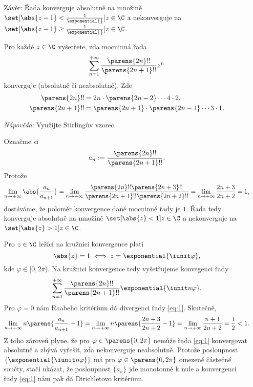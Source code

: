 \documentclass[answers]{exam}
\begin{document}
\begin{questions}
\begin{solution}
		Závěr: Řada konverguje absolutně na množině $\set[\abs{z - 1} < \frac{1}{\exponential{}}]{z \in \C}$ a nekonverguje na $\set[\abs{z - 1} \ge \frac{1}{\exponential{}}]{z \in \C}$.
  \end{solution}

  \question
  Pro každé $z \in \C$ vyšetřete, zda mocninná řada
  \begin{equation*}
    \sum_{n = 1}^{+\infty}
		\frac{\parens{2n}!!}{\parens{2n + 1}!!}z^n
  \end{equation*}
  konverguje (absolutně či neabsolutně). Zde
  \begin{align*}
  	\parens{2n}!! &= 2n \cdot \parens{2n-2} \cdots 4\cdot 2,
  	\\
  	\parens{2n+1}!! &= \parens{2n+1} \cdot \parens{2n-1} \cdots 3 \cdot 1.
  \end{align*}
  
  \emph{Nápověda:} Využijte Stirlingův vzorec.
  
  \begin{solution}
  	Označme si
  	\begin{equation*}
  		a_n
  		:=
  		\frac{\parens{2n}!!}{\parens{2n + 1}!!}.
  	\end{equation*}
  	Protože
  	\begin{equation*}
  		\lim_{n\to+\infty}
  		\abs{\frac{a_n}{a_{n+1}}}
  		=
  		\lim_{n\to+\infty}
  		\frac{\parens{2n}!! \parens{2n+3}!!}{\parens{2n+1}!! \parens{2n+2}!!}
  		=
  		\lim_{n\to+\infty} \frac{2n+3}{2n+2}
  		=
  		1,
  	\end{equation*}
  	dostáváme, že poloměr konvergence dané mocninné řady je $1$. Řada tedy konverguje absolutně na množině $\set[\abs{z} < 1]{z \in \C}$ a nekonverguje na $\set[\abs{z} > 1]{z \in \C}$.
  	
  	Pro $z \in \C$ ležící na kružnici konvergence platí
  	\begin{equation*}
  		\abs{z} = 1
  		\iff
  		z = \exponential{\iunit \varphi},
  	\end{equation*}
  	kde $\varphi \in [0, 2\pi)$. Na kružnici konvergence tedy vyšetřujeme konvegenci řady
  	\begin{equation}
  		\label{eq:1}
	    \sum_{n = 1}^{+\infty}
			\frac{\parens{2n}!!}{\parens{2n + 1}!!} 
				\exponential{\iunit n \varphi}.	
  	\end{equation}
  	Pro $\varphi = 0$ nám Raabeho kritérium dá divergenci řady \eqref{eq:1}. Skutečně,
  	\begin{equation*}
  		\lim_{n \to+ \infty} n \parens{\frac{a_n}{a_{n+1}} - 1}
  		=
  		\lim_{n \to+ \infty} n \parens{\frac{2n + 3}{2n + 2} - 1}
  		=
  		\lim_{n \to+ \infty} \frac{n + 1}{2n + 2}
  		=
  		\frac{1}{2}
  		< 
  		1.
  	\end{equation*}
  	Z toho zároveň plyne, že pro $\varphi \in \parens{0, 2\pi}$ nemůže řada \eqref{eq:1} konvergovat absolutně a zbývá vyřešit, zda nekonverguje neabsolutně. Protože posloupnost $\{ \exponential{\iunit n \varphi} \}$ má pro $\varphi \in \parens{0, 2\pi}$ omezené částečné součty, stačí ukázat, že posloupnost $\{ a_n \}$ jde monotonně k nule a konvergenci řady \eqref{eq:1} nám pak dá Dirichletovo kritérium.
 

\end{solution}
\end{questions}
\end{document}
